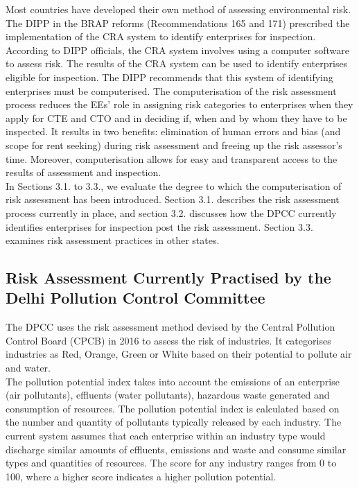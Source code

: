 \documentclass[a4paper, 12pt]{article}
\begin{document}
                 Most countries have developed their own method of assessing environmental risk. The DIPP in the BRAP reforms (Recommendations 165 and 171) prescribed the implementation of the CRA system to identify enterprises for inspection. \\ %
                 
                 According to DIPP officials, the CRA system involves using a computer software to assess risk. The results of the CRA system can be used to identify enterprises eligible for inspection. The DIPP recommends that this system of identifying enterprises must be computerised. The computerisation of the risk assessment process reduces the EEs’ role in assigning risk categories to enterprises when they apply for CTE and CTO and in deciding if, when and by whom they have to be inspected. It results in two benefits: elimination of human errors and bias (and scope for rent seeking) during  risk assessment and freeing up the risk assessor’s time. Moreover, computerisation allows for easy and transparent access to the results of assessment and inspection. \\
                 
                 In Sections 3.1. to 3.3., we evaluate the degree to which the computerisation of risk assessment has been introduced. Section 3.1. describes the risk assessment process currently in place, and section 3.2. discusses how the DPCC currently identifies enterprises for inspection post the risk assessment. Section 3.3. examines risk assessment practices in other states. \\ %
                 
                 \subsection{Risk Assessment Currently Practised by the Delhi Pollution Control Committee}
                 
                 The DPCC uses the risk assessment method devised by the Central Pollution Control Board (CPCB) in 2016 to assess the risk of industries. It categorises industries as Red, Orange, Green or White based on their potential to pollute air and water. \\
                 
                 The pollution potential index takes into account the emissions of an enterprise (air pollutants), effluents (water pollutants), hazardous waste generated and consumption of resources. The pollution potential index is calculated based on the number and quantity of pollutants typically released by each industry. The current system assumes that each enterprise within an industry type would discharge similar amounts of effluents, emissions and waste and consume similar types and quantities of resources. The score for any industry ranges from 0 to 100, where a higher score indicates a higher pollution potential. \\
                 
\end{document}
